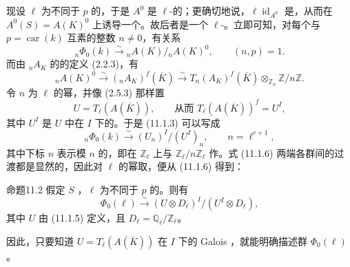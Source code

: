 现设 $\ell$ 为不同于 $p$ 的，于是 $A^0$ 是 $\ell$-的；更确切地说，$\ell\operatorname{id}_{A^0}$ 是，从而在 $A^0(S)=A(K)^0$ 上诱导一个。故后者是一个 $\ell$-。立即可知，对每个与 $p=\operatorname{car}(k)$ 互素的整数 $n\ne0$，有关系
\begin{equation}\tag{11.1.3}
 {}_n\Phi_0(k)\xrightarrow{\sim}{}_nA(K)/{}_nA(K)^0,
 \qquad (n,p)=1.
\end{equation}
而由 ${}_nA_K$ 的的定义 (2.2.3)，有
\begin{equation}\tag{11.1.4}
 {}_nA(K)^0\xrightarrow{\sim}({}_nA_K)^f(\overline K)
 \xrightarrow{\sim}T_n(A_K)^f(\overline K)\otimes_{\mathbb Z_n}\mathbb Z/n\mathbb Z.
\end{equation}
令 $n$ 为 $\ell$ 的幂，并像 (2.5.3) 那样置
\begin{equation}\tag{11.1.5}
 U=T_\ell(A(\overline K)),\qquad
 \text{从而 }T_\ell(A(\overline K))^f=U^I,
\end{equation}
其中 $U^I$ 是 $U$ 中在 $I$ 下的。于是 (11.1.3) 可以写成
\begin{equation}\tag{11.1.6}
 {}_n\Phi_0(k)\xrightarrow{\sim}(U_n)^I/(U^I)_n,
 \qquad n=\ell^{r+1},
\end{equation}
其中下标 $n$ 表示模 $n$ 的，即在 $\mathbb Z_\ell$ 上与 $\mathbb Z_\ell/n\mathbb Z_\ell$ 作。式 (11.1.6) 两端各群间的过渡都是显然的，因此对 $\ell$ 的幂取，便从 (11.1.6) 得到：

\begin{SGAresult}{命题}{11.2}
假定 $S$ ，$\ell$ 为不同于 $p$ 的。则有
\begin{equation}\tag{11.2.1}
 \Phi_0(\ell)\xrightarrow{\sim}(U\otimes D_\ell)^I/(U^I\otimes D_\ell),
\end{equation}
其中 $U$ 由 (11.1.5) 定义，且 $D_\ell=\mathbb Q_\ell/\mathbb Z_\ell$。
\end{SGAresult}
因此，只要知道 $U=T_\ell(A(\overline K))$ 在 $I$ 下的 Galois ，就能明确描述群 $\Phi_0(\ell)$。

